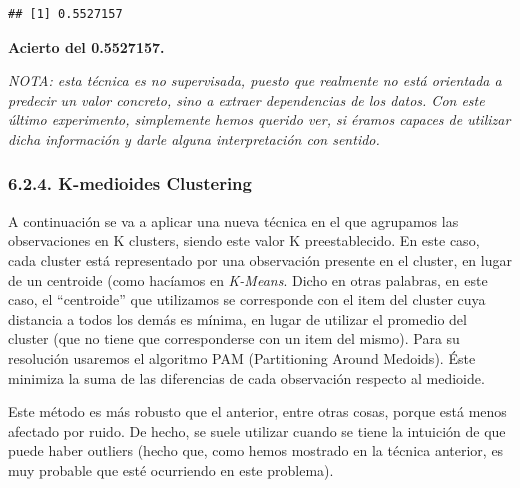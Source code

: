\documentclass[spanish,]{article}
\newenvironment{Shaded}{\begin{snugshade}}{\end{snugshade}}
\newcommand{\KeywordTok}[1]{\textcolor[rgb]{0.13,0.29,0.53}{\textbf{#1}}}
\newcommand{\StringTok}[1]{\textcolor[rgb]{0.31,0.60,0.02}{#1}}
\newcommand{\CommentTok}[1]{\textcolor[rgb]{0.56,0.35,0.01}{\textit{#1}}}
\newcommand{\OperatorTok}[1]{\textcolor[rgb]{0.81,0.36,0.00}{\textbf{#1}}}
\newcommand{\NormalTok}[1]{#1}
\begin{document}
\begin{Shaded}
\end{Shaded}

\begin{verbatim}
## [1] 0.5527157
\end{verbatim}

\textbf{Acierto del 0.5527157.}

\emph{NOTA: esta técnica es no supervisada, puesto que realmente no está
orientada a predecir un valor concreto, sino a extraer dependencias de
los datos. Con este último experimento, simplemente hemos querido ver,
si éramos capaces de utilizar dicha información y darle alguna
interpretación con sentido.}

\subsubsection{6.2.4. K-medioides
Clustering}\label{k-medioides-clustering}

A continuación se va a aplicar una nueva técnica en el que agrupamos las
observaciones en K clusters, siendo este valor K preestablecido. En este
caso, cada cluster está representado por una observación presente en el
cluster, en lugar de un centroide (como hacíamos en \emph{K-Means}.
Dicho en otras palabras, en este caso, el ``centroide'' que utilizamos
se corresponde con el item del cluster cuya distancia a todos los demás
es mínima, en lugar de utilizar el promedio del cluster (que no tiene
que corresponderse con un item del mismo). Para su resolución usaremos
el algoritmo PAM (Partitioning Around Medoids). Éste minimiza la suma de
las diferencias de cada observación respecto al medioide.

Este método es más robusto que el anterior, entre otras cosas, porque
está menos afectado por ruido. De hecho, se suele utilizar cuando se
tiene la intuición de que puede haber outliers (hecho que, como hemos
mostrado en la técnica anterior, es muy probable que esté ocurriendo en
este problema).
\end{document}

